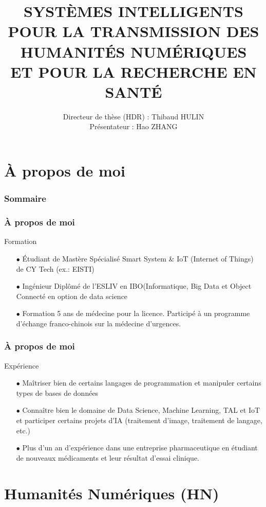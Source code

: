 \documentclass[xcolor=dvipsnames]{beamer}
\title[SYSTÈMES INTELLIGENTS]{\textsc{SYSTÈMES INTELLIGENTS \\\normalsize{POUR LA TRANSMISSION DES \\HUMANITÉS NUMÉRIQUES \\ET POUR LA RECHERCHE EN SANTÉ}}}
\institute{\large{\texttt{ELLIADD}}}
\author{Directeur de thèse (HDR) : Thibaud HULIN
\\Présentateur : Hao ZHANG}
\date{\displaydate{date}}
\begin{document}
\begin{frame}
	\titlepage
\end{frame}

\section{À propos de moi}

\begin{frame}
	\frametitle{Sommaire}
	\tableofcontents[currentsection]
\end{frame}

\begin{frame}[fragile]
	\frametitle{À propos de moi}
		\begin{block}{Formation}
			\begin{itemize}
				\item[$\bullet$]Étudiant de Mastère Spécialisé Smart System \& IoT (Internet of Things) de CY Tech (ex.: EISTI)
				\item[$\bullet$]Ingénieur Diplômé de l’ESLIV en IBO(Informatique, Big Data et Object Connecté en option de data science
				\item[$\bullet$]Formation 5 ans de médecine pour la licence. Participé à un programme d’échange franco-chinois sur la médecine d’urgences.
			\end{itemize}
		\end{block}
\end{frame}

\begin{frame}[fragile]
\frametitle{À propos de moi}
\begin{block}{Expérience}
	\begin{itemize}
		\item[$\bullet$]Maîtriser bien de certains langages de programmation et manipuler certains types de bases de données
		\item[$\bullet$]Connaître bien le domaine de Data Science, Machine Learning, TAL et IoT et participer certains projets d’IA (traitement d’image, traitement de langage, etc.)
		\item[$\bullet$]Plus d’un an d’expérience dans une entreprise pharmaceutique en étudiant de nouveaux médicaments et leur résultat d’essai clinique.
	\end{itemize}
\end{block}
\end{frame}

\section{Humanités Numériques (HN)}
\end{document}
